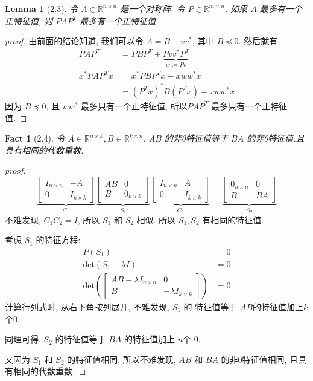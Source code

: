 \documentclass{article}
\newtheorem*{fact*}{Fact}
\newtheorem*{lemma*}{Lemma}
\begin{document}
\begin{lemma*}[2.3]
  令 $A \in \mathbb{R}^{n\times n}$ 是一个对称阵.
  令 $P \in \mathbb{R}^{m\times n}$.
  如果 $A$ 最多有一个正特征值, 则 $PAP^T$ 最多有一个正特征值.
\end{lemma*}
\begin{proof}[proof]
  由前面的结论知道, 我们可以令 $A = B + vv^*$, 其中 $B\preccurlyeq 0$.
  然后就有:
  \begin{align*}
    PAP^T &= PBP^T + \underbrace{Pvv^*P^T}_{w := Pv} \\
    x^*PAP^Tx &= x^*PBP^Tx + xww^*x \\
    &= (P^Tx)^*B(P^Tx) + xww^*x
  \end{align*}
  因为 $B\preccurlyeq 0$, 且 $ww^*$ 最多只有一个正特征值, 所以$PAP^T$ 最多只有一个正特征值.
\end{proof}
\begin{fact*}[2.4]
  令 $A\in\mathbb{R}^{n\times k}, B\in\mathbb{R}^{k\times n}$.
  $AB$ 的非0特征值等于 $BA$ 的非0特征值.且具有相同的代数重数.
\end{fact*}
\begin{proof}[proof]
  \[
    \underbrace{
      \left[
      \begin{array}{cc}
        I_{n \times n} & -A \\
        0 & I_{k\times k}
      \end{array}
    \right]
    }_{C_1}
    \underbrace{
    \left[
      \begin{array}{cc}
        AB & 0 \\
        B  & 0_{k\times k}
      \end{array}
    \right]
    }_{S_1}
    \underbrace{
    \left[
      \begin{array}{cc}
        I_{n \times n} & A \\
        0 & I_{k\times k}
      \end{array}
    \right]
    }_{C_2}
    =
    \underbrace{
    \left[
      \begin{array}{cc}
        0_{n\times n} & 0 \\
        B  & BA
      \end{array}
    \right]
    }_{S_2}
  \]
  不难发现, $C_1C_2 = I$, 所以 $S_1$ 和 $S_2$ 相似.
  所以 $S_1, S_2$ 有相同的特征值.

  考虑 $S_1$ 的特征方程:
  \begin{align*}
    P(S_1) &= 0 \\
    \mathrm{det}(S_1 - \lambda I) &= 0 \\
    \mathrm{det}\left(\left[
    \begin{array}{cc}
      AB - \lambda I_{n\times n}& 0 \\
      B & -\lambda I_{k\times k}
    \end{array}
    \right]\right) &= 0
  \end{align*}
  计算行列式时, 从右下角按列展开, 不难发现, $S_1$ 的 特征值等于 $AB$的特征值加上$k$个$0$. 

  同理可得, $S_2$ 的特征值等于 $BA$ 的特征值加上 $n$个 $0$.

  又因为 $S_1$ 和 $S_2$ 的特征值相同, 所以不难发现, $AB$ 和 $BA$ 的非0特征值相同,
  且具有相同的代数重数.
\end{proof}
\end{document}
